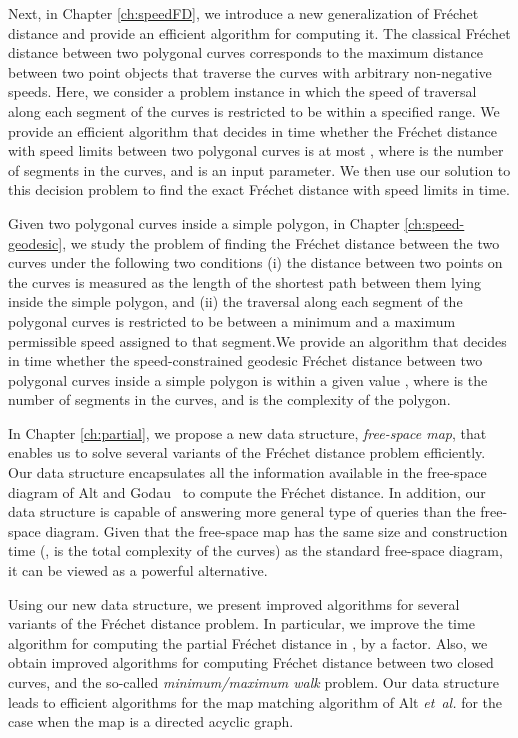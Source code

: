 \documentclass[12pt]{dalthesis}
\newcommand{\etal}{{\em et~al.\/}}
\newcommand{\Frechet}{Fr\'echet }
\begin{document}
Next, in Chapter \ref{ch:speedFD},
we introduce a new generalization of 
\Frechet distance and provide an efficient algorithm for computing it. 
The classical \Frechet distance between two polygonal curves corresponds to the 
maximum distance between two point objects that traverse the curves with arbitrary non-negative speeds.
Here, we consider a problem instance in which the speed of traversal 
along each segment of the curves is restricted to be within a specified range. 
We provide an efficient algorithm that  
decides in  time whether the \Frechet distance with speed limits
between two polygonal curves is at most ,
where  is the number of segments in the curves, and
 is an input parameter. 
We then use our solution to this decision problem 
to find the exact \Frechet distance with speed limits
in  time. 






Given two polygonal curves inside a simple polygon,
in Chapter \ref{ch:speed-geodesic}, we study the problem of finding the \Frechet distance between the two curves
under the following two conditions
(i) the distance between two points on the curves is measured as the length of the shortest path
between them lying inside the simple polygon, and 
(ii) the traversal along each segment of the polygonal curves 
is restricted to be between a minimum and a maximum permissible speed
assigned to that segment.We provide an algorithm that decides in  time 
whether the speed-constrained geodesic \Frechet distance between two polygonal curves inside a 
simple polygon is within a given value , 
where  is the number of segments in the curves, and  is the complexity of the polygon. 


In Chapter \ref{ch:partial}, 
we propose a new data structure, \emph{free-space map}, 
that enables us to solve several variants of the \Frechet distance problem efficiently.
Our data structure encapsulates all the
information available in the 
free-space diagram of Alt and Godau~\cite{AltG95} to compute the
\Frechet distance. 
In addition, our data structure is capable of answering
more general type of queries than 
the free-space diagram. 
Given that the free-space map has the same size  and 
construction time 
(,  is the total complexity of the curves)
as the standard free-space diagram,
 it can be viewed as a powerful alternative.


Using our new data structure,
we present improved algorithms 
for several variants of
the \Frechet distance problem.
In particular, we improve the 
 time algorithm 
for computing the partial \Frechet distance in \cite{AltG95}, 
by a  factor. 
Also, we obtain improved algorithms 
for computing \Frechet distance between 
two closed curves, and the so-called \emph{minimum/maximum walk} problem. 
Our data structure leads to efficient 
algorithms for
the map matching algorithm of Alt \etal 
\cite{AltERW03a}
for the case when the map is a directed acyclic graph. 
\end{document}
